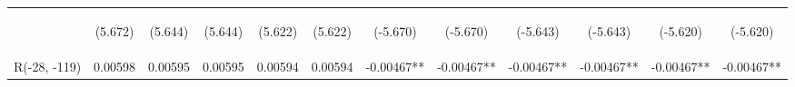 \documentclass[]{article}
\begin{document}
\begin{center}
\begin{tabular}{lccccccccccc}
        \vspace{4pt}     & \begin{footnotesize}(5.672)\end{footnotesize}  & \begin{footnotesize}(5.644)\end{footnotesize}  & \begin{footnotesize}(5.644)\end{footnotesize}  & \begin{footnotesize}(5.622)\end{footnotesize}  & \begin{footnotesize}(5.622)\end{footnotesize}  & \begin{footnotesize}(-5.670)\end{footnotesize}  & \begin{footnotesize}(-5.670)\end{footnotesize}  & \begin{footnotesize}(-5.643)\end{footnotesize} & \begin{footnotesize}(-5.643)\end{footnotesize} & \begin{footnotesize}(-5.620)\end{footnotesize} & \begin{footnotesize}(-5.620)\end{footnotesize} \\
        R(-28, -119)     & 0.00598                                        & 0.00595                                        & 0.00595                                        & 0.00594                                        & 0.00594                                        & -0.00467**                                      & -0.00467**                                      & -0.00467**                                     & -0.00467**                                     & -0.00467**                                     & -0.00467**                                     \\

\end{tabular}
\end{center}
\end{document}
